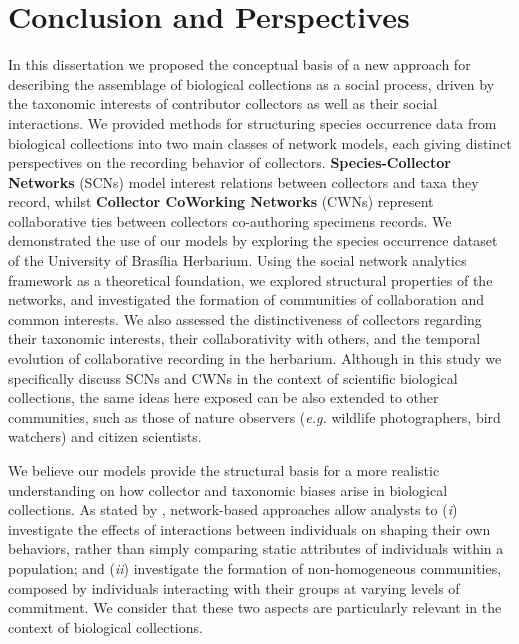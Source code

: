 \chapter{Conclusion and Perspectives}\label{conclusion_perspectives}
In this dissertation we proposed the conceptual basis of a new approach for describing the assemblage of biological collections as a social process, driven by the taxonomic interests of contributor collectors as well as their social interactions.
We provided methods for structuring species occurrence data from biological collections into two main classes of network models, each giving distinct perspectives on the recording behavior of collectors.
\textbf{Species-Collector Networks} (SCNs) model interest relations between collectors and taxa they record, whilst \textbf{Collector CoWorking Networks} (CWNs) represent collaborative ties between collectors co-authoring specimens records. 
We demonstrated the use of our models by exploring the species occurrence dataset of the University of Brasília Herbarium.
Using the social network analytics framework \cite{Barbier2011,Stork2015} as a theoretical foundation, we explored structural properties of the networks, 
and investigated the formation of communities of collaboration and common interests.
We also assessed the distinctiveness of collectors regarding their taxonomic interests, their collaborativity with others, and the temporal evolution of collaborative recording in the herbarium.
Although in this study we specifically discuss SCNs and CWNs in the context of scientific biological collections, the same ideas here exposed can be also extended to other communities, such as those of nature observers (\textit{e.g.} wildlife photographers, bird watchers) and citizen scientists.


We believe our models provide the structural basis for a more realistic understanding on how collector and taxonomic biases arise in biological collections. 
As stated by , network-based approaches allow analysts to
(\textit{i}) investigate the effects of interactions between individuals on shaping their own behaviors, rather than simply comparing static attributes of individuals within a population; and
(\textit{ii}) investigate the formation of non-homogeneous communities, composed by individuals interacting with their groups at varying levels of commitment.
We consider that these two aspects are particularly relevant in the context of biological collections.


